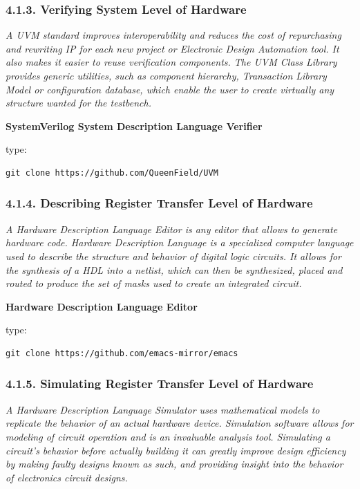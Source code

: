 \documentclass[]{article}
\begin{document}
\subsubsection{4.1.3. Verifying System Level of
Hardware}\label{verifying-system-level-of-hardware}

\emph{A UVM standard improves interoperability and reduces the cost of
repurchasing and rewriting IP for each new project or Electronic Design
Automation tool. It also makes it easier to reuse verification
components. The UVM Class Library provides generic utilities, such as
component hierarchy, Transaction Library Model or configuration
database, which enable the user to create virtually any structure wanted
for the testbench.}

\textbf{SystemVerilog System Description Language Verifier}

type:

\begin{verbatim}
git clone https://github.com/QueenField/UVM
\end{verbatim}

\subsubsection{4.1.4. Describing Register Transfer Level of
Hardware}\label{describing-register-transfer-level-of-hardware}

\emph{A Hardware Description Language Editor is any editor that allows
to generate hardware code. Hardware Description Language is a
specialized computer language used to describe the structure and
behavior of digital logic circuits. It allows for the synthesis of a HDL
into a netlist, which can then be synthesized, placed and routed to
produce the set of masks used to create an integrated circuit.}

\textbf{Hardware Description Language Editor}

type:

\begin{verbatim}
git clone https://github.com/emacs-mirror/emacs
\end{verbatim}

\subsubsection{4.1.5. Simulating Register Transfer Level of
Hardware}\label{simulating-register-transfer-level-of-hardware}

\emph{A Hardware Description Language Simulator uses mathematical models
to replicate the behavior of an actual hardware device. Simulation
software allows for modeling of circuit operation and is an invaluable
analysis tool. Simulating a circuit's behavior before actually building
it can greatly improve design efficiency by making faulty designs known
as such, and providing insight into the behavior of electronics circuit
designs.}
\end{document}
